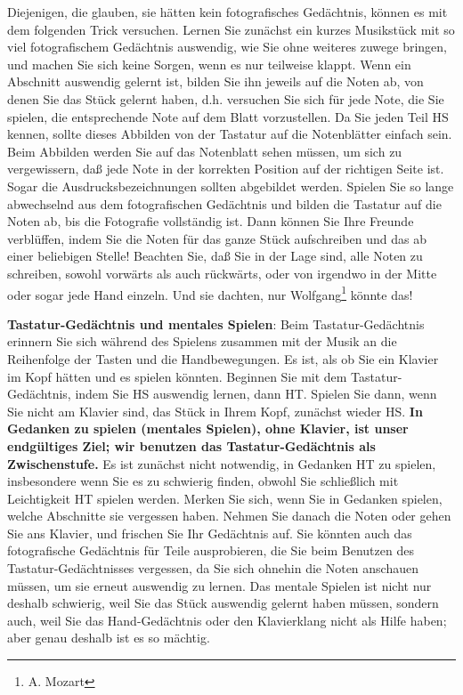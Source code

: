 Diejenigen, die glauben, sie hätten kein fotografisches Gedächtnis, können es mit dem folgenden Trick versuchen.
Lernen Sie zunächst ein kurzes Musikstück mit so viel fotografischem Gedächtnis auswendig, wie Sie ohne weiteres zuwege bringen, und machen Sie sich keine Sorgen, wenn es nur teilweise klappt.
Wenn ein Abschnitt auswendig gelernt ist, bilden Sie ihn jeweils auf die Noten ab, von denen Sie das Stück gelernt haben, d.h. versuchen Sie sich für jede Note, die Sie spielen, die entsprechende Note auf dem Blatt vorzustellen.
Da Sie jeden Teil HS kennen, sollte dieses Abbilden von der Tastatur auf die Notenblätter einfach sein.
Beim Abbilden werden Sie auf das Notenblatt sehen müssen, um sich zu vergewissern, daß jede Note in der korrekten Position auf der richtigen Seite ist.
Sogar die Ausdrucksbezeichnungen sollten abgebildet werden.
Spielen Sie so lange abwechselnd aus dem fotografischen Gedächtnis und bilden die Tastatur auf die Noten ab, bis die Fotografie vollständig ist.
Dann können Sie Ihre Freunde verblüffen, indem Sie die Noten für das ganze Stück aufschreiben und das ab einer beliebigen Stelle!
Beachten Sie, daß Sie in der Lage sind, alle Noten zu schreiben, sowohl vorwärts als auch rückwärts, oder von irgendwo in der Mitte oder sogar jede Hand einzeln.
Und sie dachten, nur Wolfgang\footnote{A. Mozart} könnte das!


\label{c1iii6tastatur}

\textbf{Tastatur-Gedächtnis und mentales Spielen}: Beim Tastatur-Gedächtnis erinnern Sie sich während des Spielens zusammen mit der Musik an die Reihenfolge der Tasten und die Handbewegungen.
Es ist, als ob Sie ein Klavier im Kopf hätten und es spielen könnten.
Beginnen Sie mit dem Tastatur-Gedächtnis, indem Sie HS auswendig lernen, dann HT.
Spielen Sie dann, wenn Sie nicht am Klavier sind, das Stück in Ihrem Kopf, zunächst wieder HS.
\textbf{In Gedanken zu spielen (mentales Spielen), ohne Klavier, ist unser endgültiges Ziel; wir benutzen das Tastatur-Gedächtnis als Zwischenstufe.}
Es ist zunächst nicht notwendig, in Gedanken HT zu spielen, insbesondere wenn Sie es zu schwierig finden, obwohl Sie schließlich mit Leichtigkeit HT spielen werden.
Merken Sie sich, wenn Sie in Gedanken spielen, welche Abschnitte sie vergessen haben.
Nehmen Sie danach die Noten oder gehen Sie ans Klavier, und frischen Sie Ihr Gedächtnis auf.
Sie könnten auch das fotografische Gedächtnis für Teile ausprobieren, die Sie beim Benutzen des Tastatur-Gedächtnisses vergessen, da Sie sich ohnehin die Noten anschauen müssen, um sie erneut auswendig zu lernen.
Das mentale Spielen ist nicht nur deshalb schwierig, weil Sie das Stück auswendig gelernt haben müssen, sondern auch, weil Sie das Hand-Gedächtnis oder den Klavierklang nicht als Hilfe haben; aber genau deshalb ist es so mächtig.

